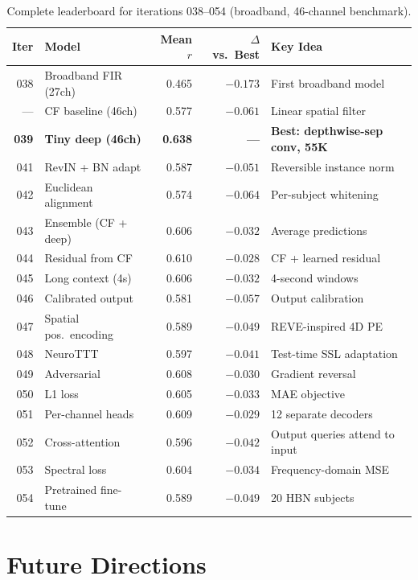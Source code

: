 \documentclass[11pt,a4paper]{article}
\begin{document}
\begin{table}[H]
\centering
\small
\caption{Complete leaderboard for iterations 038--054 (broadband, 46-channel benchmark).}
\begin{tabular}{rlrrl}
\toprule
Iter & Model & Mean $r$ & $\Delta$ vs.\ Best & Key Idea \\
\midrule
038 & Broadband FIR (27ch) & 0.465 & $-0.173$ & First broadband model \\
--- & CF baseline (46ch) & 0.577 & $-0.061$ & Linear spatial filter \\
\textbf{039} & \textbf{Tiny deep (46ch)} & \textcolor{good}{\textbf{0.638}} & \textbf{---} & \textbf{Best: depthwise-sep conv, 55K} \\
\midrule
041 & RevIN + BN adapt & 0.587 & $-0.051$ & Reversible instance norm \\
042 & Euclidean alignment & 0.574 & $-0.064$ & Per-subject whitening \\
043 & Ensemble (CF + deep) & 0.606 & $-0.032$ & Average predictions \\
044 & Residual from CF & 0.610 & $-0.028$ & CF + learned residual \\
045 & Long context (4s) & 0.606 & $-0.032$ & 4-second windows \\
046 & Calibrated output & 0.581 & $-0.057$ & Output calibration \\
047 & Spatial pos.\ encoding & 0.589 & $-0.049$ & REVE-inspired 4D PE \\
048 & NeuroTTT & 0.597 & $-0.041$ & Test-time SSL adaptation \\
049 & Adversarial & 0.608 & $-0.030$ & Gradient reversal \\
050 & L1 loss & 0.605 & $-0.033$ & MAE objective \\
051 & Per-channel heads & 0.609 & $-0.029$ & 12 separate decoders \\
052 & Cross-attention & 0.596 & $-0.042$ & Output queries attend to input \\
053 & Spectral loss & 0.604 & $-0.034$ & Frequency-domain MSE \\
054 & Pretrained fine-tune & 0.589 & $-0.049$ & 20 HBN subjects \\
\bottomrule
\end{tabular}
\end{table}

\section{Future Directions}
\end{document}
